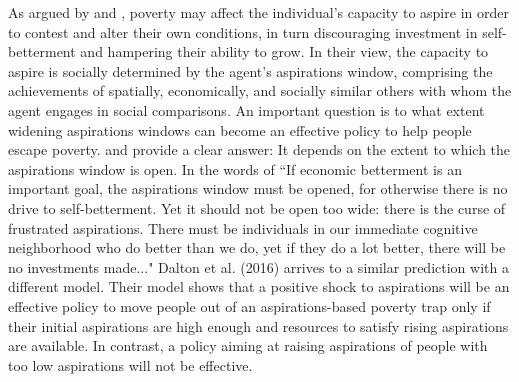 \documentclass[11.5pt]{article}
\begin{document}
As argued by \citet{Appadurai2004} and \citet{Ray2006}, poverty may affect the individual's capacity to aspire in order to contest and alter their own conditions, in turn discouraging investment in self-betterment and hampering their ability to grow. In their view, the capacity to aspire is socially determined by the agent's aspirations window, comprising the achievements of spatially, economically, and socially similar others with whom the agent engages in social comparisons. An important question is to what extent widening aspirations windows can become an effective policy to help people escape poverty. \citet{Ray2006} and \citet{Genicot2017} provide a clear answer: It depends on the extent to which the aspirations window is open. In the words of \citet[][p.4]{Ray2003} ``If economic betterment is an important goal, the aspirations window must be opened, for otherwise there is no drive to self-betterment. Yet it should not be open too wide: there is the curse of frustrated aspirations. There must be individuals in our immediate cognitive neighborhood who do better than we do, yet if they do a lot better, there will be no investments made..."  Dalton et al. (2016) arrives to a similar prediction with a different model. Their model shows that a positive shock to aspirations will be an effective policy to move people out of an aspirations-based poverty trap only if their initial aspirations are high enough and resources to satisfy rising aspirations are available. In contrast, a policy aiming at raising aspirations of people with too low aspirations will not be effective.



\end{document}
